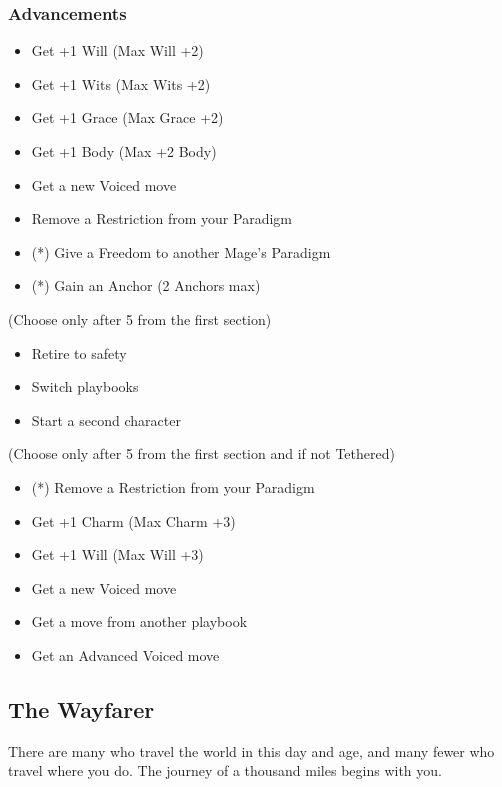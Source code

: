 \documentclass[
]{article}
\providecommand{\tightlist}{%
  \setlength{\itemsep}{0pt}\setlength{\parskip}{0pt}}
\begin{document}
\hypertarget{advancements-7}{%
\subsubsection{Advancements}\label{advancements-7}}

\begin{itemize}
\tightlist
\item
  Get +1 Will (Max Will +2)
\item
  Get +1 Wits (Max Wits +2)
\item
  Get +1 Grace (Max Grace +2)
\item
  Get +1 Body (Max +2 Body)
\item
  Get a new Voiced move
\item
  Remove a Restriction from your Paradigm
\item
  (*) Give a Freedom to another Mage's Paradigm
\item
  (*) Gain an Anchor (2 Anchors max)
\end{itemize}

(Choose only after 5 from the first section)

\begin{itemize}
\tightlist
\item
  Retire to safety
\item
  Switch playbooks
\item
  Start a second character
\end{itemize}

(Choose only after 5 from the first section and if not Tethered)

\begin{itemize}
\tightlist
\item
  (*) Remove a Restriction from your Paradigm
\item
  Get +1 Charm (Max Charm +3)
\item
  Get +1 Will (Max Will +3)
\item
  Get a new Voiced move
\item
  Get a move from another playbook
\item
  Get an Advanced Voiced move
\end{itemize}

\newpage

\hypertarget{the-wayfarer}{%
\subsection{The Wayfarer}\label{the-wayfarer}}

There are many who travel the world in this day and age, and many fewer
who travel where you do. The journey of a thousand miles begins with
you.
\end{document}
